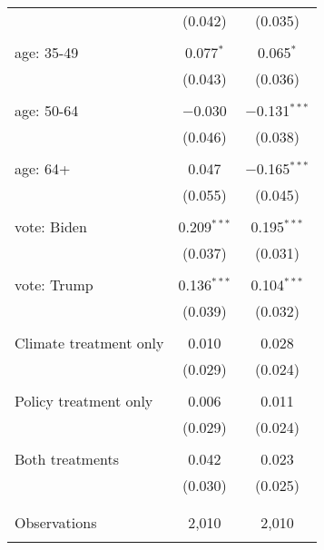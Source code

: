 \begin{tabular}{@{\extracolsep{5pt}}lcc}
  & (0.042) & (0.035) \\ 
  & & \\ 
 age: 35-49 & 0.077$^{*}$ & 0.065$^{*}$ \\ 
  & (0.043) & (0.036) \\ 
  & & \\ 
 age: 50-64 & $-$0.030 & $-$0.131$^{***}$ \\ 
  & (0.046) & (0.038) \\ 
  & & \\ 
 age: 64+ & 0.047 & $-$0.165$^{***}$ \\ 
  & (0.055) & (0.045) \\ 
  & & \\ 
 vote: Biden & 0.209$^{***}$ & 0.195$^{***}$ \\ 
  & (0.037) & (0.031) \\ 
  & & \\ 
 vote: Trump & 0.136$^{***}$ & 0.104$^{***}$ \\ 
  & (0.039) & (0.032) \\ 
  & & \\ 
 Climate treatment only & 0.010 & 0.028 \\ 
  & (0.029) & (0.024) \\ 
  & & \\ 
 Policy treatment only & 0.006 & 0.011 \\ 
  & (0.029) & (0.024) \\ 
  & & \\ 
 Both treatments & 0.042 & 0.023 \\ 
  & (0.030) & (0.025) \\ 
  & & \\ 
\hline \\[-1.8ex] 

Observations & 2,010 & 2,010 \\ 
\hline 
\hline \\[-1.8ex] 
\end{tabular} 